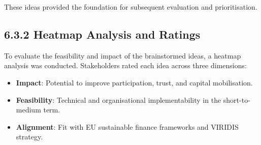 \documentclass[
  english,
  12pt,
  oneside,
  open=any]{scrbook}
\providecommand{\tightlist}{%
  \setlength{\itemsep}{0pt}\setlength{\parskip}{0pt}}\usepackage{longtable,booktabs,array}
\begin{document}
These ideas provided the foundation for subsequent evaluation and
prioritisation.

\subsection{6.3.2 Heatmap Analysis and Ratings}\label{sec-heatmap}

To evaluate the feasibility and impact of the brainstormed ideas, a
heatmap analysis was conducted. Stakeholders rated each idea across
three dimensions:

\begin{itemize}
\tightlist
\item
  \textbf{Impact}: Potential to improve participation, trust, and
  capital mobilisation.\\
\item
  \textbf{Feasibility}: Technical and organisational implementability in
  the short-to-medium term.\\
\item
  \textbf{Alignment}: Fit with EU sustainable finance frameworks and
  VIRIDIS strategy.
\end{itemize}
\end{document}
